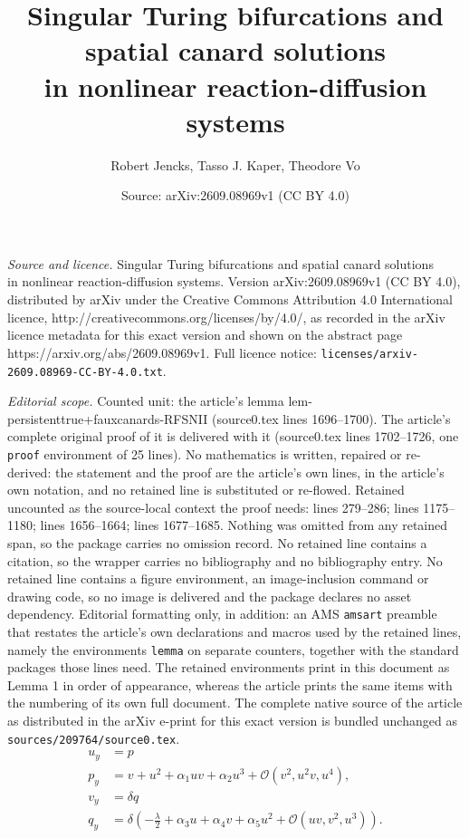 \documentclass[10pt,a4paper]{amsart}
\title{Singular Turing bifurcations and spatial canard solutions \\ in nonlinear reaction-diffusion systems}
\author{Robert Jencks, Tasso J. Kaper, Theodore Vo}
\date{Source: arXiv:2609.08969v1 (CC BY 4.0)}
\begin{document}
\maketitle

\noindent\emph{Source and licence.} Singular Turing bifurcations and spatial canard solutions \\ in nonlinear reaction-diffusion systems. Version arXiv:2609.08969v1 (CC BY 4.0), distributed by arXiv under the Creative Commons Attribution 4.0 International licence, http://creativecommons.org/licenses/by/4.0/, as recorded in the arXiv licence metadata for this exact version and shown on the abstract page https://arxiv.org/abs/2609.08969v1. Full licence notice: \texttt{licenses/arxiv-2609.08969-CC-BY-4.0.txt}.\par\smallskip

\noindent\textit{Editorial scope.} Counted unit: the article's lemma lem-persistenttrue+fauxcanards-RFSNII (source0.tex lines 1696--1700). The article's complete original proof of it is delivered with it (source0.tex lines 1702--1726, one \texttt{proof} environment of 25 lines). No mathematics is written, repaired or re-derived: the statement and the proof are the article's own lines, in the article's own notation, and no retained line is substituted or re-flowed.  Retained uncounted as the source-local context the proof needs: lines 279--286; lines 1175--1180; lines 1656--1664; lines 1677--1685.  Nothing was omitted from any retained span, so the package carries no omission record.  No retained line contains a citation, so the wrapper carries no bibliography and no bibliography entry.  No retained line contains a figure environment, an image-inclusion command or drawing code, so no image is delivered and the package declares no asset dependency.  Editorial formatting only, in addition: an AMS \texttt{amsart} preamble that restates the article's own declarations and macros used by the retained lines, namely the environments \texttt{lemma} on separate counters, together with the standard packages those lines need.  The retained environments print in this document as Lemma 1 in order of appearance, whereas the article prints the same items with the numbering of its own full document.  The complete native source of the article as distributed in the arXiv e-print for this exact version is bundled unchanged as \texttt{sources/209764/source0.tex}.
\begin{equation}  \label{eq:y-ODE}
\begin{split}
    u_y &= p \\
    p_y &= v + u^2 + \alpha_1 uv + \alpha_2 u^3 + \mathcal{O}(v^2, u^2v, u^4),  \\
    v_y &= \delta q \\
    q_y &= \delta \left( -\frac{\lambda}{2} + \alpha_3 u + \alpha_4 v + \alpha_5 u^2 + \mathcal{O}(uv,v^2,u^3)\right).
\end{split}
\end{equation}
\end{document}
